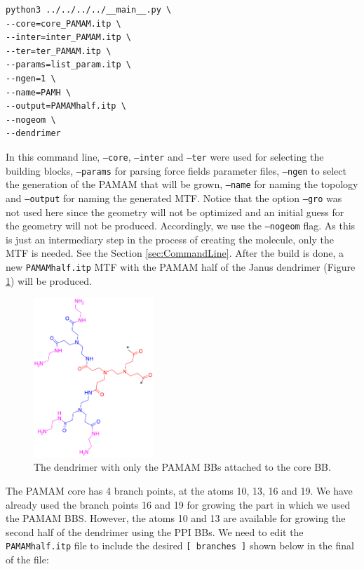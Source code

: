 \begin{lstlisting}
python3 ../../../../__main__.py \
--core=core_PAMAM.itp \
--inter=inter_PAMAM.itp \
--ter=ter_PAMAM.itp \
--params=list_param.itp \
--ngen=1 \
--name=PAMH \
--output=PAMAMhalf.itp \
--nogeom \
--dendrimer
\end{lstlisting}

In this command line, \texttt{--core}, \texttt{--inter} and \texttt{--ter} were used for selecting the building blocks, \texttt{--params} for parsing force fields parameter files, \texttt{--ngen} to select the generation of the PAMAM that will be grown, \texttt{--name} for naming the topology and \texttt{--output} for naming the generated MTF.
Notice that the option \texttt{--gro} was not used here since the geometry will not be optimized and an initial guess for the geometry will not be produced.
Accordingly, we use the \texttt{--nogeom} flag.
As this is just an intermediary step in the process of creating the molecule, only the MTF is needed.
See the Section \ref{sec:CommandLine}.
After the build is done, a new \texttt{PAMAMhalf.itp} MTF with the PAMAM half of the Janus dendrimer (Figure \ref{fig:JanusPAMAMhalf}) will be produced.

\begin{figure}
    \centering
    \includegraphics[width=0.4\textwidth]{PAMAM_PPI-Janus/JANUSPAMAMhalf.png}
    \caption{The dendrimer with only the PAMAM BBs attached to the core BB.}
    \label{fig:JanusPAMAMhalf}
\end{figure}

The PAMAM core has 4 branch points, at the atoms 10, 13, 16 and 19.
We have already used the branch points 16 and 19 for growing the part in which we used the PAMAM BBS.
However, the atoms 10 and 13 are available for growing the second half of the dendrimer using the PPI BBs.
We need to edit the \texttt{PAMAMhalf.itp} file
to include the desired \texttt{[ branches ]} shown below in the final of the file:

